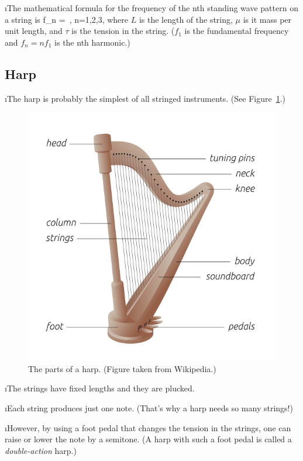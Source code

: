 \i The mathematical formula for the frequency
of the nth standing wave pattern on a string
is
%
\be
f_n = \sqrt{\frac{\tau}{\mu}}\,,
\qquad
n=1,2,3,\cdots
\ee
%
where $L$ is the length of the string,
$\mu$ is it mass per unit length, and 
$\tau$ is the tension in the string.
($f_1$ is the fundamental frequency and 
$f_n = nf_1$ is the nth harmonic.)

\ei
\subsection{Harp}
\bi

\i The harp is probably the simplest of all stringed
instruments.
(See Figure~\ref{f:harp}.)
%
\begin{figure}[htbp]
\begin{center}
\includegraphics[width=.8\textwidth]{Harp.png}
\caption{The parts of a harp.
(Figure taken from Wikipedia.)}
\label{f:harp}
\end{center}
\end{figure}

\i The strings have fixed lengths and they are 
plucked.

\i Each string produces just one note.
(That's why a harp needs so many strings!)

\i However, by using a foot pedal that changes
the tension in the strings, one can raise or 
lower the note by a semitone.
(A harp with such a foot pedal is called a 
{\em double-action} harp.)

